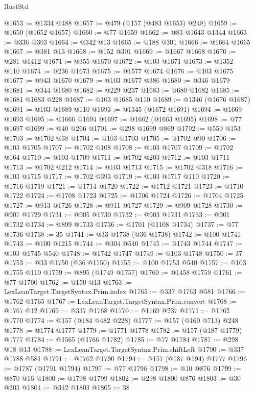 \begin{lexlean}{RustStd}
\begin{coremodule}
@1653 := @1334 @488
@1657 := @479 (@157 (@483 @1653) @248)
@1659 := @1650 (@1652 @1657)
@1660 := @77 @1659
@1662 := @83 @1643 @1344
@1663 := @336 @303
@1664 := @342 @13
@1665 := @188 @301
@1666 := @1664 @1665
@1667 := @381 @13
@1668 := @152 @301
@1669 := @1667 @1668
@1670 := @281 @1412
@1671 := @355 @1670
@1672 := @103 @1671
@1673 := @1352 @110
@1674 := @236 @1673
@1675 := @1577 @1674
@1676 := @103 @1675
@1677 := @943 @1670
@1679 := @103 @1677 @386
@1680 := @346 @1679
@1681 := @344 @1680
@1682 := @229 @237
@1683 := @680 @1682
@1685 := @1681 @1683 @228
@1687 := @103 @1685 @110
@1689 := @1346 (@1676 @1687)
@1691 := @103 @1689 @110
@1693 := @1345 (@1672 @1691)
@1694 := @1669 @1693
@1695 := @1666 @1694
@1697 := @1662 (@1663 @1695)
@1698 := @77 @1697
@1699 := @40 @266
@1701 := @298 @1699 @869
@1702 := @550 @153
@1703 := @1702 @38
@1704 := @103 @1703
@1705 := @1702 @90
@1706 := @103 @1705
@1707 := @1702 @108
@1708 := @103 @1707
@1709 := @1702 @164
@1710 := @103 @1709
@1711 := @1702 @203
@1712 := @103 @1711
@1713 := @1702 @212
@1714 := @103 @1713
@1715 := @1702 @318
@1716 := @103 @1715
@1717 := @1702 @393
@1719 := @103 @1717 @110
@1720 := @1716 @1719
@1721 := @1714 @1720
@1722 := @1712 @1721
@1723 := @1710 @1722
@1724 := @1708 @1723
@1725 := @1706 @1724
@1726 := @1704 @1725
@1727 := @913 @1726
@1728 := @911 @1727
@1729 := @909 @1728
@1730 := @907 @1729
@1731 := @905 @1730
@1732 := @903 @1731
@1733 := @901 @1732
@1734 := @899 @1733
@1736 := @1701 (@1108 @1734)
@1737 := @77 @1736
@1738 := 35
@1741 := @33 @1738 (@36 @1738)
@1742 := @100 @1741
@1743 := @100 @1215
@1744 := @304 @540
@1745 := @1743 @1744
@1747 := @103 @1745 @540
@1748 := @1742 @1747
@1749 := @103 @1748
@1750 := 37
@1753 := @33 @1750 (@36 @1750)
@1755 := @100 @1753 @540
@1757 := @103 @1755 @110
@1759 := @895 (@1749 @1757)
@1760 := @1458 @1759
@1761 := @77 @1760
@1762 := @150 @13
@1763 := LexLeanTarget.TargetSyntax.Prim.index
@1765 := @337 @1763 @581
@1766 := @1762 @1765
@1767 := LexLeanTarget.TargetSyntax.Prim.convert
@1768 := @1767 @12
@1769 := @337 @1768
@1770 := @1769 @237
@1771 := @1762 @1770
@1774 := @157 (@184 @482 @228)
@1777 := @157 (@160 @713) @248
@1778 := @1774 @1777
@1779 := @1771 @1778
@1782 := @157 (@187 @1779) @1777
@1784 := @1565 (@1766 @1782)
@1785 := @77 @1784
@1787 := @298 @18 @13
@1788 := LexLeanTarget.TargetSyntax.Prim.shiftLeft
@1790 := @337 @1788 @581
@1791 := @1762 @1790
@1794 := @157 (@187 @194) @1777
@1796 := @1787 (@1791 @1794)
@1797 := @77 @1796
@1798 := @10 @876
@1799 := @870 @16
@1800 := @1798 @1799
@1802 := @298 @1800 @876
@1803 := @30 @203
@1804 := @342 @1803
@1805 := 38

\end{coremodule}
\end{lexlean}
